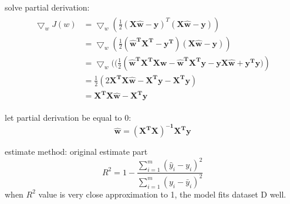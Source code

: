 \documentclass[12pt]{ctexart}%
\begin{document}
	solve partial derivation:
	\begin{align}
	\begin{split}
    \bigtriangledown_wJ(w) &= \bigtriangledown_w(\frac{1}{2}(\boldsymbol{X\hat{w}} - \boldsymbol{y})^T(\boldsymbol{X\hat{w}} - \boldsymbol{y}))\\
    &= \bigtriangledown_w(\frac{1}{2}(\boldsymbol{\hat{w}^TX^T} - \boldsymbol{y^T})(\boldsymbol{X\hat{w}} - \boldsymbol{y}))\\
    &= \bigtriangledown_w((\frac{1}{2}(\boldsymbol{\hat{w}^TX^TXw} - \boldsymbol{\hat{w}^TX^Ty} - \boldsymbol{yX\hat{w}} + \boldsymbol{y^Ty)})\\
    &= \frac{1}{2}(2\boldsymbol{X^TX\hat{w}} - \boldsymbol{X^Ty} -\boldsymbol{X^Ty})\\
    &= \boldsymbol{X^TX\hat{w}} - \boldsymbol{X^Ty}
	\end{split}
	\end{align}
	
	let partial derivation be equal to 0:
	\begin{equation}
	\boldsymbol{\hat{w}} = \boldsymbol{(X^TX)^{-1}X^Ty}
	\end{equation} 
	
	estimate method:
	original estimate part 
	\begin{equation}
	R^2 = 1-\frac{\sum_{i=1}^{m}(\hat{y}_i - y_i)^2}{\sum_{i=1}^{m}(y_i - \bar{y}_i)^2}
	\end{equation}
	when $R^2$ value is very close approximation to 1, the model fits dataset D well.
\end{document}
